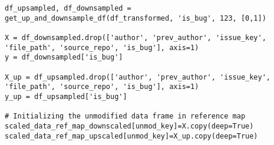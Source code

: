 \begin{code}
\label{code:scalers:setup-of-objects-and-drop-text-cols}
\begin{verbatim}
df_upsampled, df_downsampled = get_up_and_downsample_df(df_transformed, 'is_bug', 123, [0,1])

X = df_downsampled.drop(['author', 'prev_author', 'issue_key', 'file_path', 'source_repo', 'is_bug'], axis=1)
y = df_downsampled['is_bug']

X_up = df_upsampled.drop(['author', 'prev_author', 'issue_key', 'file_path', 'source_repo', 'is_bug'], axis=1)
y_up = df_upsampled['is_bug']

# Initializing the unmodified data frame in reference map
scaled_data_ref_map_downscaled[unmod_key]=X.copy(deep=True)
scaled_data_ref_map_upscaled[unmod_key]=X_up.copy(deep=True)
\end{verbatim}
\end{code}

